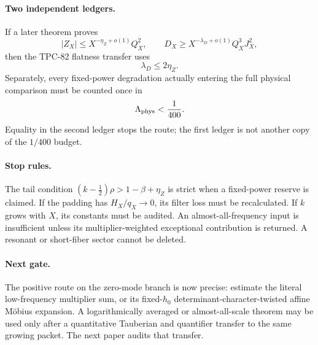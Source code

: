\paragraph{Two independent ledgers.}
If a later theorem proves
\[
 |Z_X|\le X^{-\eta_Z+o(1)}Q_X^2,\qquad
 D_X\ge X^{-\lambda_D+o(1)}Q_X^3J_X^2,
\]
then the TPC-82 flatness transfer uses
\[
 \lambda_D\le2\eta_Z.
\]
Separately, every fixed-power degradation actually entering the full
physical comparison must be counted once in
\[
 \Lambda_{\rm phys}<\frac1{400}.
\]
Equality in the second ledger stops the route; the first ledger is
not another copy of the \(1/400\) budget.

\paragraph{Stop rules.}
The tail condition
\((k-\tfrac12)\rho>1-\beta+\eta_Z\) is strict when a fixed-power
reserve is claimed.  If the padding has \(H_X/q_X\to0\), its filter
loss must be recalculated.  If \(k\) grows with \(X\), its constants
must be audited.  An almost-all-frequency input is insufficient unless
its multiplier-weighted exceptional contribution is returned.  A
resonant or short-fiber sector cannot be deleted.

\paragraph{Next gate.}
The positive route on the zero-mode branch is now precise: estimate the literal
low-frequency multiplier sum, or its fixed-\(h_0\)
determinant-character-twisted affine M\"obius expansion.  A
logarithmically averaged or
almost-all-scale theorem may be used only after a quantitative
Tauberian and quantifier transfer to the same growing packet.  The
next paper audits that transfer.
